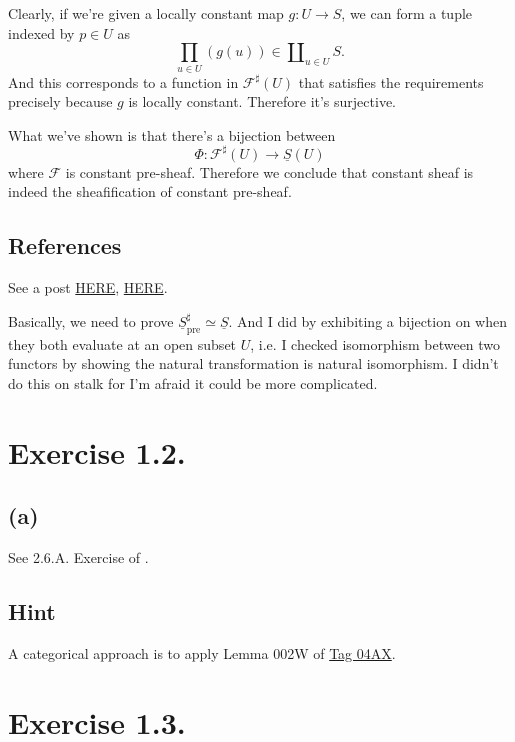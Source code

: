 Clearly, if we're given a locally constant map $g:U\to S$, we can form a tuple indexed by $p\in U$ as
\[\prod_{u\in U} (g(u))\in \amalg_{u\in U}S.\] And this corresponds to a function in $\mathscr F^{\sharp}(U)$ that satisfies the requirements precisely because $g$ is locally constant. Therefore it's surjective.

What we've shown is that there's a bijection between 
\[\Phi:\mathscr F^{\sharp}(U)\to\underline{S}(U)\] where $\mathscr F$ is constant pre-sheaf. Therefore we conclude that constant sheaf is indeed the sheafification of constant pre-sheaf.

\subsection{References}

See a post \href{https://math.stackexchange.com/questions/249961/sheafification-of-the-constant-presheaf}{HERE}, \href{https://math.stackexchange.com/questions/3834390/sheafification-of-constant-presheaf}{HERE}.

Basically, we need to prove $\underline{S}_{\text{pre}}^{\sharp}\simeq \underline{S}$. And I did by exhibiting a bijection on when they both evaluate at an open subset $U$, i.e. I checked isomorphism between two functors by showing the natural transformation is natural isomorphism.
I didn't do this on stalk for I'm afraid it could be more complicated.

\section{Exercise 1.2.}

\subsection{(a)}

See 2.6.A. Exercise  of \cite{RaviRisingSea}.

\subsection{Hint}

A categorical approach is to apply Lemma 002W of \href{https://stacks.math.columbia.edu/tag/04AX}{Tag 04AX}.

\section{Exercise 1.3.}

